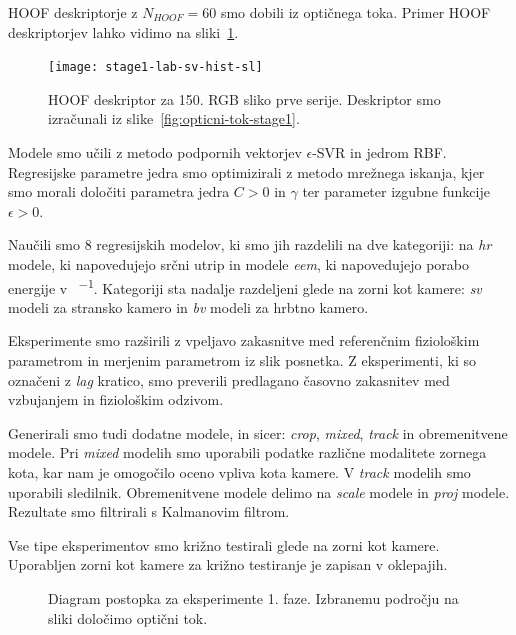 HOOF deskriptorje z $N_{HOOF} = 60 $ smo dobili iz optičnega toka. Primer HOOF deskriptorjev lahko vidimo na sliki~\ref{fig:hoof-znacilke}.

\begin{figure}[!htb]
	\centering
	\texttt{[image: stage1-lab-sv-hist-sl]}
	\caption[HOOF deskriptor za 150. RGB sliko prve serije]{HOOF deskriptor za 150. RGB sliko prve serije. Deskriptor smo izračunali iz slike~\ref{fig:opticni-tok-stage1}.}
	\label{fig:hoof-znacilke}
\end{figure}

Modele smo učili z metodo podpornih vektorjev $\epsilon$-SVR in jedrom RBF. Regresijske parametre jedra smo optimizirali z metodo mrežnega iskanja, kjer smo morali določiti parametra jedra $C > 0$ in $\gamma$ ter parameter izgubne funkcije $\epsilon > 0$.

Naučili smo \num{8} regresijskih modelov, ki smo jih razdelili na dve kategoriji: na \textit{hr} modele, ki napovedujejo srčni utrip in modele \textit{eem}, ki napovedujejo porabo energije v \si{\kcal\per\min}. Kategoriji sta nadalje razdeljeni glede na zorni kot kamere: \textit{sv} modeli za stransko kamero in \textit{bv} modeli za hrbtno kamero. 

Eksperimente smo razširili z vpeljavo zakasnitve med referenčnim fiziološkim parametrom in merjenim parametrom iz slik posnetka. Z eksperimenti, ki so označeni z \textit{lag} kratico, smo preverili predlagano časovno zakasnitev med vzbujanjem in fiziološkim odzivom. 

Generirali smo tudi dodatne modele, in sicer: \textit{crop}, \textit{mixed}, \textit{track} in obremenitvene modele. Pri \textit{mixed} modelih smo uporabili podatke različne modalitete zornega kota, kar nam je omogočilo oceno vpliva kota kamere. V \textit{track} modelih smo uporabili sledilnik. Obremenitvene modele delimo na \textit{scale} modele in \textit{proj} modele. Rezultate smo filtrirali s Kalmanovim filtrom.

Vse tipe eksperimentov smo križno testirali glede na zorni kot kamere. Uporabljen zorni kot kamere za križno testiranje je zapisan v oklepajih.


\begin{figure}[!htb]
	\centering
	\resizebox{\columnwidth}{!}{}
	\caption[Diagram postopka za eksperimente 1. faze]{Diagram postopka za eksperimente 1. faze. Izbranemu področju na sliki določimo optični tok.}
	\label{fig:diagram-procesiranja-stage1}
\end{figure}

